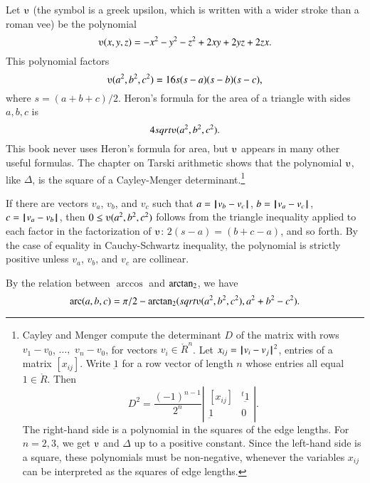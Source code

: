 Let $\ups$ (the symbol is a greek upsilon, which is written with a
wider stroke than a roman vee) be the polynomial
    $$\ups(x,y,z) = -x^2 - y^2 - z^2 + 2 x y + 2 y z + 2 z x.$$
This polynomial factors
    $$\ups(a^2,b^2,c^2) = 16 s (s-a) (s-b) (s-c),$$
where $s = (a+b+c)/2$.  Heron's formula for the area of 
a triangle with
sides $a,b,c$ is $$4\sqrt{\ups(a^2,b^2,c^2)}.$$  This
book never uses Heron's formula for area, but $\ups$
appears in many other useful formulas.
  The chapter on
Tarski arithmetic shows that the polynomial
$\ups$, like $\Delta$, 
is the square of a Cayley-Menger determinant.\footnote{
Cayley and Menger compute the determinant $D$ of the
matrix with rows $v_1-v_0$, $\ldots,$ $v_n-v_0$, 
for vectors $v_i\in\ring{R}^n$.   Let
$x_{ij} = {\hskip0.1em|\hskip-0.15em|\hskip0.1em}v_i - v_j{\hskip0.1em|\hskip-0.15em|\hskip0.1em}^2$, entries of a matrix $[x_{ij}]$.
Write $\underbar 1$ for a row vector of length $n$ 
whose entries all equal $1\in\ring{R}$.
Then 
$$
D^2 = \frac{(-1)^{n-1}}{2^n}
    \left|\begin{matrix}[x_{ij}]& {}^t{\underbar 1}\\ {\underbar 1}& 0
        \end{matrix}\right|.
$$
The right-hand side is a polynomial in the squares of the edge lengths.
For $n=2,3$, we get $\ups$  and $\Delta$ up to a positive constant.  Since
the left-hand side is a square, these polynomials must
be non-negative, whenever the variables $x_{ij}$ can be interpreted
as the squares of edge lengths.}


If there are vectors $v_a$, $v_b$, and $v_c$ such that $a = {\hskip0.1em|\hskip-0.15em|\hskip0.1em}v_b
 -  v_c{\hskip0.1em|\hskip-0.15em|\hskip0.1em}$, $b = {\hskip0.1em|\hskip-0.15em|\hskip0.1em}v_a  -  v_c{\hskip0.1em|\hskip-0.15em|\hskip0.1em}$, $c = {\hskip0.1em|\hskip-0.15em|\hskip0.1em}v_a  -  v_b{\hskip0.1em|\hskip-0.15em|\hskip0.1em}$, then $0\le
\ups(a^2,b^2,c^2)$ follows from the triangle inequality applied to
each factor in the factorization of $\ups$: $2(s-a) = (b+c-a)$, and
so forth.  By the case of equality in Cauchy-Schwartz
inequality, the polynomial is strictly positive unless $v_a$,
$v_b$, and $v_c$ are collinear.

By the relation between $\arccos$ and ${\operatorname{arctan_2}}$, we have
  $$
  \arc(a,b,c) = 
    \pi/2 - \atn({\sqrt{\ups(a^2,b^2,c^2)}},{ a^2 + b^2 - c^2}).
    $$



